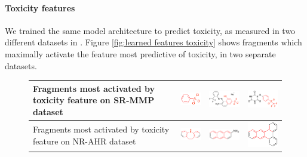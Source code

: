 \documentclass{article}
\newcommand{\citet}{\cite}
\begin{document}
\paragraph{Toxicity features}
We trained the same model architecture to predict toxicity, as measured in two different datasets in \citet{tox21}.
Figure \ref{fig:learned features toxicity} shows fragments which maximally activate the feature most predictive of toxicity, in two separate datasets.
\newcommand{\molfeaturetox}[2]{\texttt{[image: fig\_11.pdf]}}%
\begin{figure}[h]
\begin{tabular}{>{\centering}m{1in} >{\centering}m{3.1cm} >{\centering}m{3.3cm} >{\centering\arraybackslash}m{3.1cm}}
Fragments most activated by toxicity feature on SR-MMP dataset
& \includegraphics[width=2.2cm]{figures/jorge-figures/7.png} 
& \includegraphics[width=3.3cm]{figures/jorge-figures/8.png}
& \includegraphics[width=3.3cm]{figures/jorge-figures/9.png}\\
\midrule
Fragments most activated by toxicity feature on NR-AHR dataset
& \includegraphics[width=2.2cm]{figures/jorge-figures/10.png} 
& \includegraphics[width=3.3cm]{figures/jorge-figures/11.png}
& \includegraphics[width=2.9cm]{figures/jorge-figures/12.png}\\

\end{tabular}
\end{figure}
\end{document}
